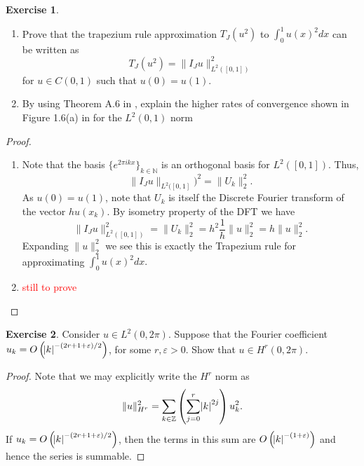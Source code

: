 \documentclass{amsart}
\theoremstyle{plain}
\theoremstyle{definition}
\newtheorem{exer}{Exercise}[section]
\newcommand{\Z}{\mathbb{Z}}
\newcommand{\N}{\mathbb{N}}
\newcommand{\tcr}[1]{\textcolor{red}{#1}}
\begin{document}
\begin{exer}
    \begin{enumerate}[label=\alph*.]
        \item Prove that the trapezium rule approximation $T_J \left(u^2\right)$ to $\int_0^1 u(x)^2 dx $  can be written as 
        $$T_J(u^2) = \|I_{J}u\|_{L^2\left([0,1]\right)}^2$$ for $u\in C(0,1)$ such that $u(0)=u(1)$.
        \item By using Theorem A.6 in \cite{lord2014introduction}, explain the higher rates of convergence shown in Figure 1.6(a) in \cite{lord2014introduction} for the $L^2(0,1)$ norm
    \end{enumerate}
    
\end{exer}
\begin{proof}
    \begin{enumerate}[label=\alph*.]
        \item Note that the basis $\{e^{2\pi i k x}\}_{k\in\N}$ is an orthogonal basis for $L^{2}([0,1]).$ Thus, 
        $$\|I_{J}u\|_{L^2([0,1]})^2 = \|U_k\|_{2}^2.$$
        As $u(0)= u(1)$, note that $U_k$ is itself the Discrete Fourier transform of the vector $h u(x_k).$ By isometry property of the DFT we have
        $$\|I_{J}u\|_{L^2([0,1])}^2 = \|U_k\|_{2}^2 = h^2\frac{1}{h} \|u\|_2^2 = h\|u\|_{2}^2.$$
        Expanding $\|u\|_{2}^2$ we see this is exactly the Trapezium rule for approximating $\int_0^1 u(x)^2 dx.$
        \item \tcr{still to prove}
    \end{enumerate}  
\end{proof}

\begin{exer}
    Consider $u \in L^2(0,2\pi)$. Suppose that the Fourier coefficient $u_k = O\left(\abs{k}^{-(2r+1+\varepsilon)/2}\right) $, for some $r,\varepsilon >0$. Show that $u \in H^r (0,2\pi)$.
\end{exer}
\begin{proof}
Note that we may explicitly write the $H^r$ norm as 
$$\|u\|_{H^r}^2 = \sum_{k\in \Z}\left(\sum_{j=0}^r \abs{k}^{2j}\right)u_k^2.$$
If $u_k = O\left(\abs{k}^{-(2r+1+\varepsilon)/2}\right)$, then the terms in this sum are $O\left(\abs{k}^{-(1+\varepsilon)}\right)$ and hence the series is summable. 
\end{proof}
\end{document}
